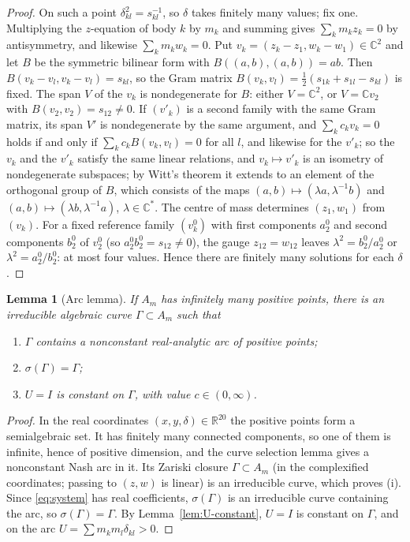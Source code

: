 \documentclass[11pt]{amsart}
\newenvironment{romanlist}{\begin{enumerate}\renewcommand{\labelenumi}{(\roman{enumi})}%
  \renewcommand{\theenumi}{\roman{enumi}}}{\end{enumerate}}
\newtheorem{lemma}[theorem]{Lemma}
\theoremstyle{definition}
\theoremstyle{remark}
\newcommand{\C}{\mathbb{C}}
\newcommand{\R}{\mathbb{R}}
\begin{document}
\begin{proof}
On such a point $\delta_{kl}^2=s_{kl}^{-1}$, so $\delta$ takes finitely many values; fix one.
Multiplying the $z$-equation of body $k$ by $m_k$ and summing gives $\sum_km_kz_k=0$ by
antisymmetry, and likewise $\sum_km_kw_k=0$.  Put $v_k=(z_k-z_1,w_k-w_1)\in\C^2$ and let $B$ be
the symmetric bilinear form with $B((a,b),(a,b))=ab$.  Then $B(v_k-v_l,v_k-v_l)=s_{kl}$, so the
Gram matrix $B(v_k,v_l)=\frac12(s_{1k}+s_{1l}-s_{kl})$ is fixed.  The span $V$ of the $v_k$ is
nondegenerate for $B$: either $V=\C^2$, or $V=\C v_2$ with $B(v_2,v_2)=s_{12}\ne0$.  If
$(v'_k)$ is a second family with the same Gram matrix, its span $V'$ is nondegenerate by the
same argument, and $\sum_kc_kv_k=0$ holds if and only if $\sum_kc_kB(v_k,v_l)=0$ for all $l$,
and likewise for the $v'_k$; so the $v_k$ and the $v'_k$ satisfy the same linear relations, and
$v_k\mapsto v'_k$ is an isometry of nondegenerate subspaces; by Witt's theorem it extends to an
element of the orthogonal group of $B$, which consists of the maps $(a,b)\mapsto(\lambda a,
\lambda^{-1}b)$ and $(a,b)\mapsto(\lambda b,\lambda^{-1}a)$, $\lambda\in\C^*$.  The centre of
mass determines $(z_1,w_1)$ from $(v_k)$.  For a fixed reference family $(v^0_k)$ with first
components $a^0_2$ and second components $b^0_2$ of $v^0_2$ (so $a^0_2b^0_2=s_{12}\ne0$), the gauge
$z_{12}=w_{12}$ leaves $\lambda^2=b^0_2/a^0_2$ or $\lambda^2=a^0_2/b^0_2$: at most four values.
Hence there are finitely many solutions for each $\delta$.
\end{proof}

\begin{lemma}[Arc lemma]\label{lem:arc}
If $A_m$ has infinitely many positive points, there is an irreducible algebraic curve
$\Gamma\subset A_m$ such that
\begin{romanlist}
  \item $\Gamma$ contains a nonconstant real-analytic arc of positive points;
  \item $\sigma(\Gamma)=\Gamma$;
  \item $U=I$ is constant on $\Gamma$, with value $c\in(0,\infty)$.
\end{romanlist}
\end{lemma}

\begin{proof}
In the real coordinates $(x,y,\delta)\in\R^{20}$ the positive points form a semialgebraic set.
It has finitely many connected components, so one of them is infinite, hence of positive
dimension, and the curve selection lemma \cite[Thm.~2.5.5]{BCR} gives a nonconstant Nash arc in
it.  Its Zariski
closure $\Gamma\subset A_m$ (in the complexified coordinates; passing to $(z,w)$ is linear) is an
irreducible curve, which proves (i).  Since \eqref{eq:system} has real coefficients, $\sigma(
\Gamma)$ is an irreducible curve containing the arc, so $\sigma(\Gamma)=\Gamma$.  By
Lemma~\ref{lem:U-constant}, $U=I$ is constant on $\Gamma$, and on the arc
$U=\sum m_km_l\delta_{kl}>0$.
\end{proof}
\end{document}
